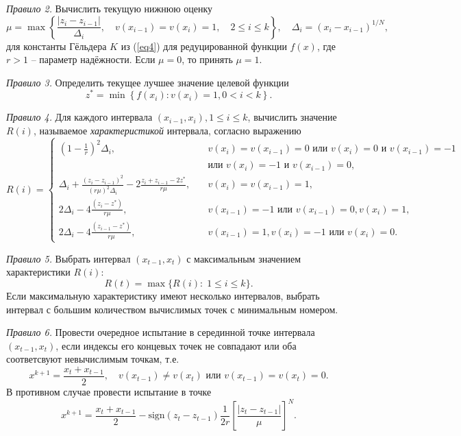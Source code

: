 \documentclass[10pt,a4paper]{book}
\begin{document}
\textit{Правило 2.} Вычислить текущую нижнюю оценку
\begin{equation}\label{eq7} 
\mu = \max\left\{ \frac{|z_i-z_{i-1}|}{\Delta _i},\quad v(x_{i-1})=v(x_i)=1, \quad 2 \leq i \leq k  \right\},\quad \Delta _i= (x_i-x_{i-1})^{1/N},
\end{equation}
для константы Гёльдера $K$ из (\ref{eq4}) для редуцированной функции $f(x)$, где $r>1$ -- параметр надёжности. Если $\mu=0$, то принять $\mu=1$.

\textit{Правило 3.} Определить текущее лучшее значение целевой функции
\begin{equation}\label{eq8} 
z^*= \min \left\{ f(x_i): v(x_i)=1, 0 < i < k \right\}.
\end{equation}

\textit{Правило 4.} Для каждого интервала $(x_{i-1},x_i),1 \leq i \leq k$, вычислить значение $R(i)$, называемое \textit{характеристикой} интервала, согласно выражению
\begin{equation}\label{eq9} 
R(i)=
  \begin{cases}
    {(1-\frac{1}{r})}^2 \Delta _i,& {\quad v(x_i)=v(x_{i-1})=0 \text{ или } v(x_i)=0 \text{ и } v(x_{i-1})=-1}\\
    {} & {\quad \text{или } v(x_i)=-1  \text{ и } v(x_{i-1})=0},\\
    \Delta _i+\frac {{(z_i-z_{i-1})}^2}{{(r \mu)}^2 \Delta _i} - 2 \frac {z_i+z_{i-1}-2z^*}{r \mu}, & {\quad  v(x_i)=v(x_{i-1})=1},\\
    2 \Delta _i-4 \frac {(z_i-z^*)}{r \mu}, & {\quad  v(x_{i-1})=-1 \text{ или } v(x_{i-1})=0, v(x_i)=1},\\
    2 \Delta _i-4 \frac {(z_{i-1}-z^*)}{r \mu}, & {\quad  v(x_{i-1})=1, v(x_i)=-1 \text{ или } v(x_i)=0.}
  \end{cases}
\end{equation}

\textit{Правило 5.} Выбрать интервал $(x_{t-1},x_t)$ с максимальным значением характеристики $R(i)$:
\[
R(t)= \max\{R(i): \; 1 \leq i \leq k\}.
\]
Если максимальную характеристику имеют несколько интервалов, выбрать интервал с большим количеством вычислимых точек с минимальным номером.

\textit{Правило 6.} Провести очередное испытание в серединной точке интервала $(x_{t-1},x_t)$, если индексы его концевых точек не совпадают или оба соответсвуют невычислимым точкам, т.е.
\begin{equation}\label{eq10} 
x^{k+1}=\frac {x_t+x_{t-1}}{2},\quad v(x_{t-1})\neq v(x_t) \text{ или } v(x_{t-1})=v(x_t)=0.
\end{equation}
В противном случае провести испытание в точке 
\begin{equation}\label{eq11} 
x^{k+1}= \frac {x_t+x_{t-1}}{2} -  \text{sign} {(z_t-z_{t-1})} \frac{1}{2r} \left[\frac {{|z_t-z_{t-1}|}}{\mu} \right]^N.
\end{equation}
\end{document}
